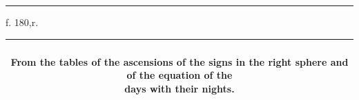 \documentclass[11pt]{article}
\renewcommand{\arraystretch}{1.18}
\begin{document}
\clearpage
\noindent{}
\par\vspace{-1mm}\noindent\rule{\textwidth}{.4pt}\par\vspace{1mm}
\begin{center}{\small f. 180,r.}\end{center}\vspace{-3mm}
\begin{center}\setlength{\tabcolsep}{3pt}\renewcommand{\arraystretch}{1.02}\begin{tabular}{||c|>{\centering\arraybackslash}p{27mm}|>{\centering\arraybackslash}p{25mm}||>{\centering\arraybackslash}p{27mm}|>{\centering\arraybackslash}p{25mm}||>{\centering\arraybackslash}p{27mm}|>{\centering\arraybackslash}p{25mm}||}\hline
\multicolumn{7}{||c||}{\parbox{170mm}{\centering{}\\\textbf{From the tables of the ascensions of the signs in the right sphere and of the equation of the}\\\textbf{days with their nights.}\vspace{1mm}}} \\ \hline

\end{tabular}
\end{center}
\end{document}
